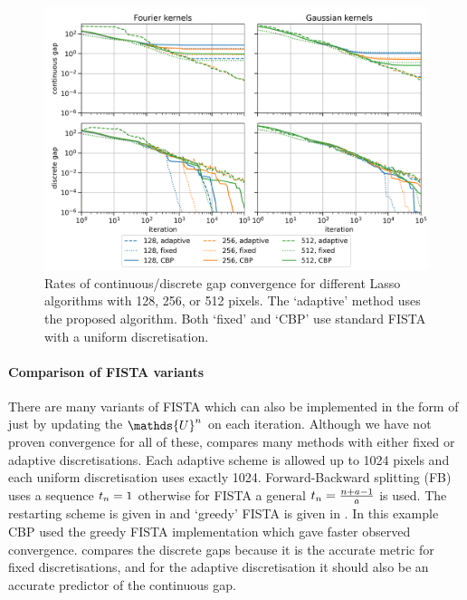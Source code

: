 \documentclass[10pt,a4paper,onecolumn]{article} \usepackage[latin1]{inputenc}
\numberwithin{equation}{section}
\let\F\mathds\let\C\mathcal\newcommand{\R}{\F{R}}\newcommand{\A}{\C{A}}
\newcommand*{\spcf}[1]{%
	\IfEqCase{#1}{%
		{0}{\F{U}}%
		{1}{\F{V}}%
		{2}{\F{W}}%
	}[\F{U}#1]%
}
\newcommand*{\vart}[1]{%
	\IfEqCase{#1}{%
		{0}{s}%
		{1}{t}%
	}[t#1]%
}
\begin{document}
\begin{figure}[H]\centering
	\includegraphics[width=.84\textwidth]{lasso_ndofs_convergence}
	\caption{Rates of continuous/discrete gap convergence for different Lasso algorithms with 128, 256, or 512 pixels. The `adaptive' method uses the proposed algorithm. Both `fixed' and `CBP' use standard FISTA with a uniform discretisation.}\label{fig:ca: convergence with ndofs}
\end{figure}

\paragraph{Comparison of FISTA variants}
There are many variants of FISTA which can also be implemented in the form of  just by updating the $\spcf0^n$ on each iteration. Although we have not proven convergence for all of these,  compares many methods with either fixed or adaptive discretisations. Each adaptive scheme is allowed up to 1024 pixels and each uniform discretisation uses exactly 1024. Forward-Backward splitting (FB) uses a sequence $\vart1_n=1$ otherwise for FISTA a general $\vart1_n = \frac{n+a-1}{a}$ is used. The restarting scheme is given in  and `greedy' FISTA is given in . In this example CBP used the greedy FISTA implementation which gave faster observed convergence.  compares the discrete gaps because it is the accurate metric for fixed discretisations, and for the adaptive discretisation it should also be an accurate predictor of the continuous gap. 
\end{document}

